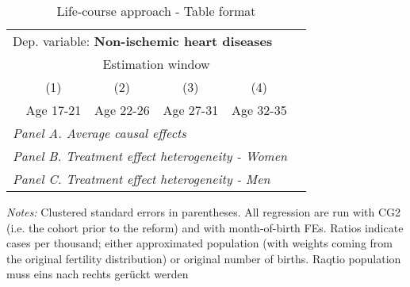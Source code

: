  \begin{table}[H] \centering \begin{threeparttable} \caption{Life-course approach - Table format} {\def\sym#1{\ifmmode^{#1}\else\(^{#1}\)\fi} \begin{tabular}{l*{5}{c}} \toprule \multicolumn{5}{l}{Dep. variable: \textbf{Non-ischemic heart diseases}} \\ & \multicolumn{4}{c}{Estimation window} \\ \cmidrule(lr){2-5}
            &\multicolumn{1}{c}{(1)}&\multicolumn{1}{c}{(2)}&\multicolumn{1}{c}{(3)}&\multicolumn{1}{c}{(4)}\\
            &\multicolumn{1}{c}{Age 17-21}&\multicolumn{1}{c}{Age 22-26}&\multicolumn{1}{c}{Age 27-31}&\multicolumn{1}{c}{Age 32-35}\\
\midrule
 \multicolumn{5}{l}{\emph{Panel A. Average causal effects}} \\      \midrule\multicolumn{5}{l}{\emph{Panel B. Treatment effect heterogeneity - Women}} \\      \midrule\multicolumn{5}{l}{\emph{Panel C. Treatment effect heterogeneity - Men}} \\      
\bottomrule \end{tabular} } \begin{tablenotes} \item \scriptsize \emph{Notes:} Clustered standard errors in parentheses. All regression are run with CG2 (i.e. the cohort prior to the reform) and with month-of-birth FEs. Ratios indicate cases per thousand; either approximated population (with weights coming from the original fertility distribution) or original number of births. Raqtio population muss eins nach rechts gerückt werden \end{tablenotes} \end{threeparttable} \end{table} 
